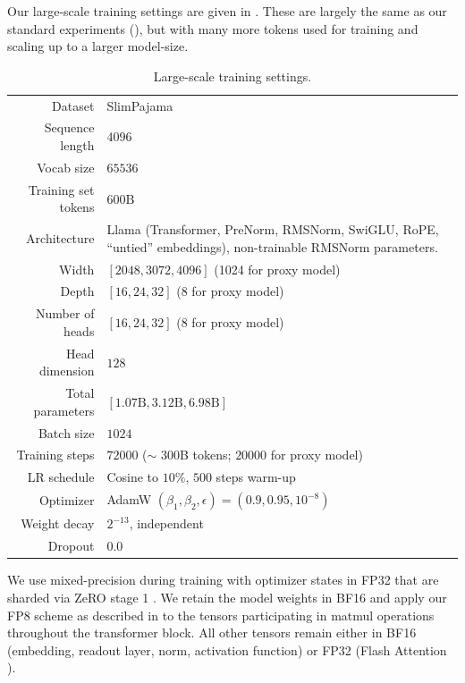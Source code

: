 Our large-scale training settings are given in . These are largely the same as our standard experiments (), but with many more tokens used for training and scaling up to a larger model-size.
\begin{table}[h] 
    \centering
    \renewcommand{\arraystretch}{1.25}
    \begin{tabular}{|r|p{10cm}|}
    \hline
        Dataset & SlimPajama \citep{SlimPajama} \\
        Sequence length & $4096$ \\
        Vocab size & $65536$ \\
        Training set tokens & $600\mathrm{B}$ \\
        \hline
        Architecture & Llama \citep{Llama} \; (Transformer, PreNorm, RMSNorm, SwiGLU, RoPE, ``untied'' embeddings), non-trainable RMSNorm parameters. \\
        Width & $[2048, 3072, 4096]$ \; (1024 for proxy model) \\
        Depth & $[16, 24, 32]$ \; (8 for proxy model) \\
        Number of heads & $[16, 24, 32]$ \; (8 for proxy model) \\
        Head dimension & $128$ \\
        Total parameters & $[1.07\mathrm{B}, 3.12\mathrm{B}, 6.98\mathrm{B}]$\\
        \hline
        Batch size & $1024$ \\
        Training steps & $72000$ \; ($\sim$ 300B tokens; $20000$ for proxy model) \\
        LR schedule & Cosine to $10\%$, $500$ steps warm-up \\
        Optimizer & AdamW $(\beta_1, \beta_2, \epsilon) = (0.9, 0.95, 10^{-8})$ \\
        Weight decay & $2^{-13}$, independent \citep{Independent_WD} \\
        Dropout & $0.0$ \\
    \hline
    \end{tabular}
    \caption{Large-scale training settings.}
    \label{tab:large_scale_experiment_defaults}
\end{table}

We use mixed-precision during training with optimizer states in FP32 that are sharded via ZeRO stage 1 \citep{Zero}. We retain the model weights in BF16 and apply our FP8 scheme as described in  to the tensors participating in matmul operations throughout the transformer block. All other tensors remain either in BF16 (embedding, readout layer, norm, activation function) or FP32 (Flash Attention \citep{Flash_Attention}).

